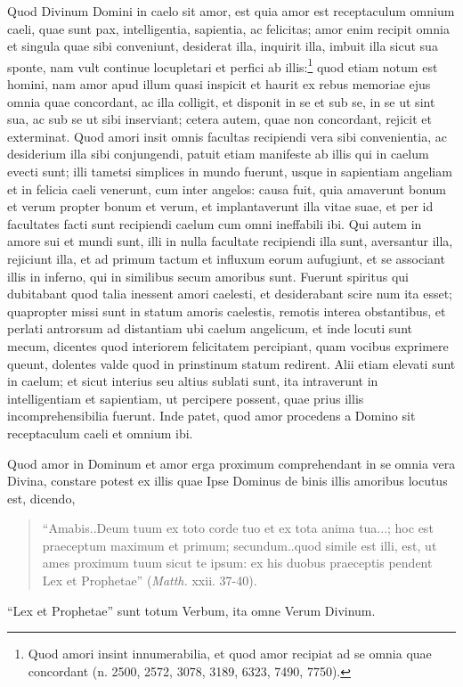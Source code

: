 \begin{topic}{18}
    Quod Divinum Domini in caelo sit amor, est quia amor est receptaculum omnium caeli, quae sunt pax, intelligentia,
    sapientia, ac felicitas; amor enim recipit omnia et singula quae sibi conveniunt, desiderat illa, inquirit illa,
    imbuit illa sicut sua sponte, nam vult continue locupletari et perfici ab illis:\footnote{Quod amori insint
    innumerabilia, et quod amor recipiat ad se omnia quae concordant (n. 2500, 2572, 3078, 3189, 6323, 7490, 7750).}
    quod etiam notum est homini, nam amor apud illum quasi inspicit et haurit ex rebus memoriae ejus omnia quae
    concordant, ac illa colligit, et disponit in se et sub se, in se ut sint sua, ac sub se ut sibi inserviant; cetera
    autem, quae non concordant, rejicit et exterminat.
    Quod amori insit omnis facultas recipiendi vera sibi convenientia, ac desiderium illa sibi conjungendi, patuit etiam
    manifeste ab illis qui in caelum evecti sunt; illi tametsi simplices in mundo fuerunt, usque in sapientiam angeliam
    et in felicia caeli venerunt, cum inter angelos: causa fuit, quia amaverunt bonum et verum propter bonum et verum,
    et implantaverunt illa vitae suae, et per id facultates facti sunt recipiendi caelum cum omni ineffabili ibi.
    Qui autem in amore sui et mundi sunt, illi in nulla facultate recipiendi illa sunt, aversantur illa, rejiciunt
    illa, et ad primum tactum et influxum eorum aufugiunt, et se associant illis in inferno, qui in similibus secum
    amoribus sunt.
    Fuerunt spiritus qui dubitabant quod talia inessent amori caelesti, et desiderabant scire num ita esset; quapropter
    missi sunt in statum amoris caelestis, remotis interea obstantibus, et perlati antrorsum ad distantiam ubi caelum
    angelicum, et inde locuti sunt mecum, dicentes quod interiorem felicitatem percipiant, quam vocibus exprimere
    queunt, dolentes valde quod in prinstinum statum redirent.
    Alii etiam elevati sunt in caelum; et sicut interius seu altius sublati sunt, ita intraverunt in intelligentiam et
    sapientiam, ut percipere possent, quae prius illis incomprehensibilia fuerunt.
    Inde patet, quod amor procedens a Domino sit receptaculum caeli et omnium ibi.
\end{topic}

\begin{topic}{19}
    Quod amor in Dominum et amor erga proximum comprehendant in se omnia vera Divina, constare potest ex illis quae Ipse
    Dominus de binis illis amoribus locutus est, dicendo,
    \begin{quote}
        ``Amabis..Deum tuum ex toto corde tuo et ex tota anima tua...; hoc est praeceptum maximum et primum;
        secundum..quod simile est illi, est, ut ames proximum tuum sicut te ipsum: ex his duobus praeceptis pendent Lex
        et Prophetae'' (\emph{Matth.} xxii. 37-40).
    \end{quote}
    ``Lex et Prophetae'' sunt totum Verbum, ita omne Verum Divinum.
\end{topic}
